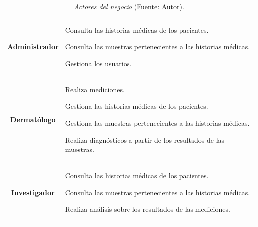 		\begin{table}[h]
		\small
		\caption[Actores del negocio]{\textit{Actores del negocio} (Fuente: Autor).}
		\centering
		\setlength{\extrarowheight}{\altocelda}
		\begin{tabulary}{\anchotabla}{|c|J|}
			\hline
			 & \\ \hline
			\textbf{Administrador} & 
			
			Consulta las historias m\'{e}dicas de los pacientes.
			
			Consulta las muestras pertenecientes a las historias m\'{e}dicas.
			
			Gestiona los usuarios.
		\\ \hline
			\textbf{Dermat\'{o}logo} & 
			Realiza mediciones.
			
			Gestiona las historias m\'{e}dicas de los pacientes.
			
			Gestiona las muestras pertenecientes a las historias m\'{e}dicas.
			
			Realiza diagn\'{o}sticos a partir de los resultados de las muestras.
		\\ \hline
			\textbf{Investigador} &
			
			Consulta las historias m\'{e}dicas de los pacientes.
			
			Consulta las muestras pertenecientes a las historias m\'{e}dicas.
			
			Realiza an\'{a}lisis sobre los resultados de las mediciones.\\ \hline
		\end{tabulary}
	\end{table}
	
